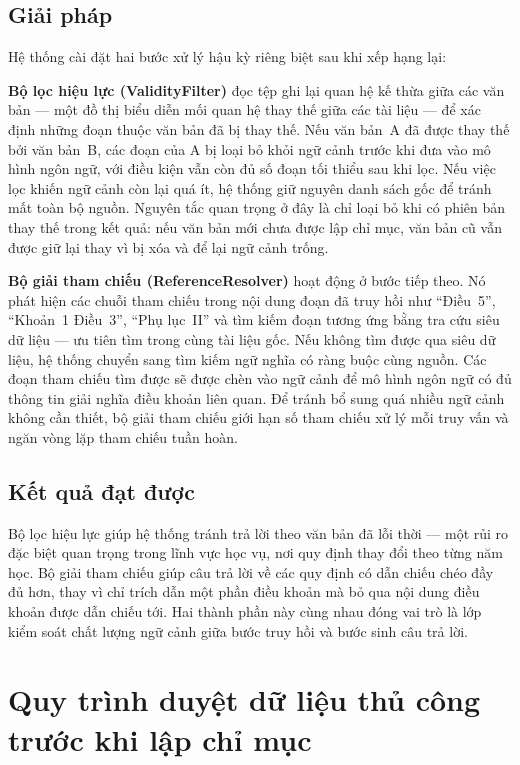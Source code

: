 \documentclass[../DoAn.tex]{subfiles}
\begin{document}
\subsection{Giải pháp}

Hệ thống cài đặt hai bước xử lý hậu kỳ riêng biệt sau khi xếp hạng lại:

\textbf{Bộ lọc hiệu lực (ValidityFilter)} đọc tệp ghi lại quan hệ kế thừa giữa
các văn bản --- một đồ thị biểu diễn mối quan hệ thay thế giữa các tài liệu ---
để xác định những đoạn thuộc văn bản đã bị thay thế. Nếu văn bản~A đã được thay
thế bởi văn bản~B, các đoạn của A bị loại bỏ khỏi ngữ cảnh trước khi đưa vào
mô hình ngôn ngữ, với điều kiện vẫn còn đủ số đoạn tối thiểu sau khi lọc. Nếu
việc lọc khiến ngữ cảnh còn lại quá ít, hệ thống giữ nguyên danh sách gốc để
tránh mất toàn bộ nguồn. Nguyên tắc quan trọng ở đây là chỉ loại bỏ khi có
phiên bản thay thế trong kết quả: nếu văn bản mới chưa được lập chỉ mục, văn
bản cũ vẫn được giữ lại thay vì bị xóa và để lại ngữ cảnh trống.

\textbf{Bộ giải tham chiếu (ReferenceResolver)} hoạt động ở bước tiếp theo. Nó
phát hiện các chuỗi tham chiếu trong nội dung đoạn đã truy hồi như ``Điều~5'',
``Khoản~1 Điều~3'', ``Phụ lục~II'' và tìm kiếm đoạn tương ứng bằng tra cứu siêu
dữ liệu --- ưu tiên tìm trong cùng tài liệu gốc. Nếu không tìm được qua siêu
dữ liệu, hệ thống chuyển sang tìm kiếm ngữ nghĩa có ràng buộc cùng nguồn. Các
đoạn tham chiếu tìm được sẽ được chèn vào ngữ cảnh để mô hình ngôn ngữ có đủ
thông tin giải nghĩa điều khoản liên quan. Để tránh bổ sung quá nhiều ngữ cảnh
không cần thiết, bộ giải tham chiếu giới hạn số tham chiếu xử lý mỗi truy vấn
và ngăn vòng lặp tham chiếu tuần hoàn.

\subsection{Kết quả đạt được}

Bộ lọc hiệu lực giúp hệ thống tránh trả lời theo văn bản đã lỗi thời --- một
rủi ro đặc biệt quan trọng trong lĩnh vực học vụ, nơi quy định thay đổi theo
từng năm học. Bộ giải tham chiếu giúp câu trả lời về các quy định có dẫn chiếu
chéo đầy đủ hơn, thay vì chỉ trích dẫn một phần điều khoản mà bỏ qua nội dung
điều khoản được dẫn chiếu tới. Hai thành phần này cùng nhau đóng vai trò là lớp
kiểm soát chất lượng ngữ cảnh giữa bước truy hồi và bước sinh câu trả lời.

\section{Quy trình duyệt dữ liệu thủ công trước khi lập chỉ mục}
\label{sec:ch5-admin-review}
\end{document}
